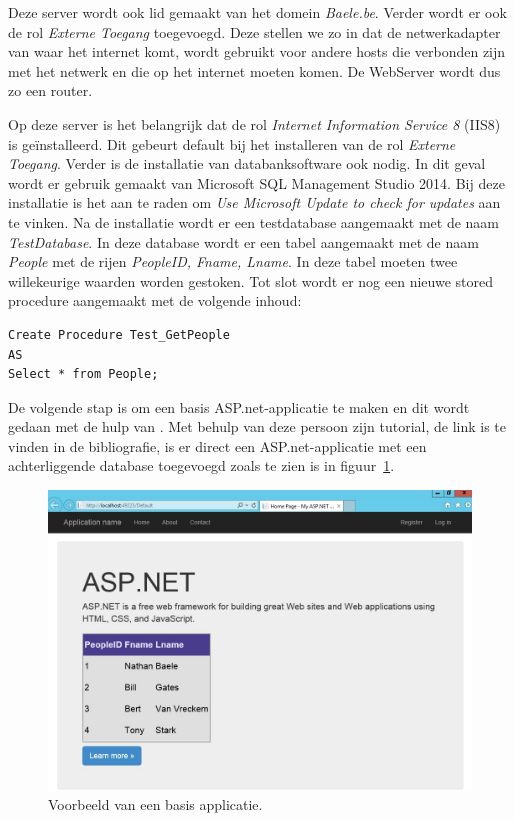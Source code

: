 \documentclass[pdftex,a4paper,12pt]{report}
\begin{document}
Deze server wordt ook lid gemaakt van het domein \textit{Baele.be}. Verder wordt er ook de rol \textit{Externe Toegang} toegevoegd. Deze stellen we zo in dat de netwerkadapter van waar het internet komt, wordt gebruikt voor andere hosts die verbonden zijn met het netwerk en die op het internet moeten komen. De WebServer wordt dus zo een router. \newline

Op deze server is het belangrijk dat de rol \textit{Internet Information Service 8} (IIS8) is geïnstalleerd. Dit gebeurt default bij het installeren van de rol \textit{Externe Toegang}. Verder is de installatie van databanksoftware ook nodig. In dit geval wordt er gebruik gemaakt van Microsoft SQL Management Studio 2014. Bij deze installatie is het aan te raden om \textit{Use Microsoft Update to check for updates} aan te vinken. Na de installatie wordt er een testdatabase aangemaakt met de naam \textit{TestDatabase}. In deze database wordt er een tabel aangemaakt met de naam \textit{People} met de rijen \textit{PeopleID, Fname, Lname}. In deze tabel moeten twee willekeurige waarden worden gestoken. Tot slot wordt er nog een nieuwe stored procedure aangemaakt met de volgende inhoud:
\begin{verbatim}
Create Procedure Test_GetPeople
AS
Select * from People;
\end{verbatim}

De volgende stap is om een basis ASP.net-applicatie te maken en dit wordt gedaan met de hulp van \cite{Nuckolls2011}. Met behulp van deze persoon zijn tutorial, de link is te vinden in de bibliografie, is er direct een ASP.net-applicatie met een achterliggende database toegevoegd zoals te zien is in figuur~\ref{img:ASPapp}. \newline

\begin{figure}[H]
\begin{center}
\includegraphics[scale=0.45]{img/ASPapp}
\end{center}
\caption{Voorbeeld van een basis applicatie.}
\label{img:ASPapp}
\end{figure}
\end{document}
